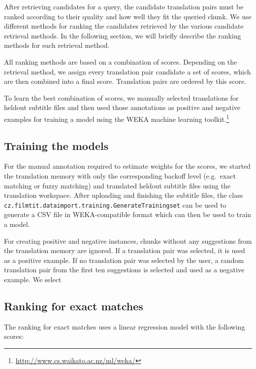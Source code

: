 After retrieving candidates for a query, the candidate translation pairs must be ranked according to their quality and how well they fit the queried chunk. We use different methods for ranking the candidates retrieved by the various candidate retrieval methods. In the following section, we will briefly describe the ranking methods for each retrieval method.

All ranking methods are based on a combination of scores. Depending on the retrieval method, we assign every translation pair candidate a set of scores, which are then combined into a final score. Translation pairs are ordered by this score.

To learn the best combination of scores, we manually selected translations for heldout subtitle files and then used those annotations as positive and negative examples for training a model using the WEKA machine learning toolkit.\footnote{\url{http://www.cs.waikato.ac.nz/ml/weka/}}

\subsection{Training the models}

For the manual annotation required to estimate weights for the scores, we started the translation memory with only the corresponding backoff level (e.g.\ exact matching or fuzzy matching) and translated heldout subtitle files using the translation workspace. After uploading and finishing the subtitle files, the class {\tt cz.filmtit.dataimport.training.GenerateTrainingset} can be used to generate a CSV file in WEKA-compatible format which can then be used to train a model.

For creating positive and negative instances, chunks without any suggestions from the translation memory are ignored. If a translation pair was selected, it is used as a positive example. If no translation pair was selected by the user, a random translation pair from the first ten suggestions is selected and used as a negative example. We select 


\subsection{Ranking for exact matches}

The ranking for exact matches uses a linear regression model with the following scores:

